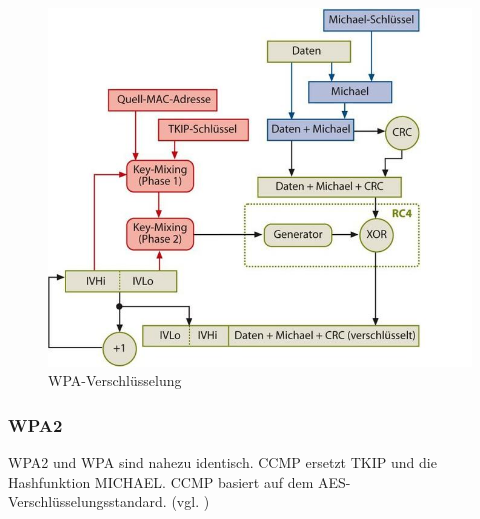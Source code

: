 \begin{figure} [htb]
\begin{centering}
\includegraphics[scale=0.6]{Bilder/Kapitel2/wpa_funktionsweise.jpg}
\caption[WPA-Verschlüsselung]{WPA-Verschlüsselung \cite{Heise-WLAN}}
\label{wpa_funktionsweise}
\end{centering}
\end{figure}
\subsubsection{\ac{WPA2}}
\ac{WPA2} und \ac{WPA} sind nahezu identisch. \ac{CCMP} ersetzt \ac{TKIP} und die Hashfunktion MICHAEL. \ac{CCMP} basiert auf dem \ac{AES}-\\
Verschlüsselungsstandard. (vgl. \cite{WPA2})
